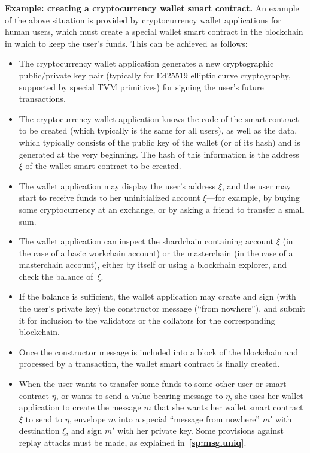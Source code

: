 \documentclass[12pt,oneside]{article}
\def\makepoint#1{\medbreak\noindent{\bf #1.\ }}
\def\nxsubpoint{\refstepcounter{subsubsection}%
  \smallbreak\makepoint{\thesubsubsection}}
\def\refpoint#1{{\rm\textbf{\ref{#1}}}}
\let\ptref=\refpoint
\def\emb#1{\textbf{#1.}}
\begin{document}
\nxsubpoint\label{sp:ex.simple.wallet}\emb{Example: creating a cryptocurrency wallet smart contract}
An example of the above situation is provided by cryptocurrency wallet applications for human users, which must create a special wallet smart contract in the blockchain in which to keep the user's funds. This can be achieved as follows:
\begin{itemize}
\item The cryptocurrency wallet application generates a new cryptographic public/private key pair (typically for Ed25519 elliptic curve cryptography, supported by special TVM primitives) for signing the user's future transactions.
\item The cryptocurrency wallet application knows the code of the smart contract to be created (which typically is the same for all users), as well as the data, which typically consists of the public key of the wallet (or of its hash) and is generated at the very beginning. The hash of this information is the address~$\xi$ of the wallet smart contract to be created.
\item The wallet application may display the user's address $\xi$, and the user may start to receive funds to her uninitialized account $\xi$---for example, by buying some cryptocurrency at an exchange, or by asking a friend to transfer a small sum.
\item The wallet application can inspect the shardchain containing account $\xi$ (in the case of a basic workchain account) or the masterchain (in the case of a masterchain account), either by itself or using a blockchain explorer, and check the balance of~$\xi$.
\item If the balance is sufficient, the wallet application may create and sign (with the user's private key) the constructor message (``from nowhere''), and submit it for inclusion to the validators or the collators for the corresponding blockchain.
\item Once the constructor message is included into a block of the blockchain and processed by a transaction, the wallet smart contract is finally created.
\item When the user wants to transfer some funds to some other user or smart contract $\eta$, or wants to send a value-bearing message to $\eta$, she uses her wallet application to create the message $m$ that she wants her wallet smart contract $\xi$ to send to $\eta$, envelope $m$ into a special ``message from nowhere'' $m'$ with destination $\xi$, and sign $m'$ with her private key. Some provisions against replay attacks must be made, as explained in~\ptref{sp:msg.uniq}.

\end{itemize}
\end{document}
